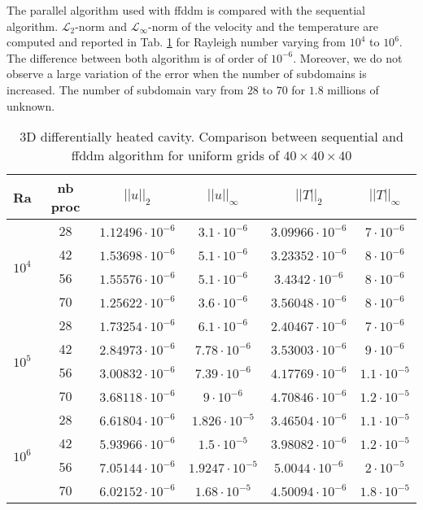 The parallel algorithm used with ffddm is compared with the sequential algorithm.
$\mathcal{L}_2$-norm and $\mathcal{L}_\infty$-norm of the velocity and the temperature are computed and reported in Tab. \ref{tab-T1} for Rayleigh number varying from $10^4$ to $10^6$.
The difference between both algorithm is of order of $10^{-6}$.
Moreover, we do not observe a large variation of the error when the number of subdomains is increased.
The number of subdomain vary from $28$ to $70$ for $1.8$ millions of unknown.

\begin{table}[!h]
	\begin{center}
		\begin{tabular}{|*{6}{c|}}
			\hline
			 Ra & nb proc                     & $||u||_{2}$                        & $||u||_{\infty}$                & $||T||_{2}$              & $||T||_{\infty}$\\ \hline \hline
			\multirow{4}{*}{$10^4$} & 28 & $1.12496 \cdot 10^{-6}$ & $3.1 \cdot 10^{-6}$ & $ 3.09966 \cdot 10^{-6} $ & $7 \cdot 10^{-6}$ \\%
			\cline{2-6}
			& 42 & $1.53698 \cdot 10^{-6}$ & $5.1 \cdot 10^{-6}$ & $ 3.23352 \cdot 10^{-6} $ & $8 \cdot 10^{-6}$ \\ \cline{2-6} %
			& 56 & $1.55576 \cdot 10^{-6}$ & $5.1 \cdot 10^{-6}$ & $ 3.4342 \cdot 10^{-6} $ & $8 \cdot 10^{-6}$  \\ \cline{2-6} %
			& 70 & $1.25622 \cdot 10^{-6}$ & $3.6 \cdot 10^{-6}$ & $ 3.56048 \cdot 10^{-6} $ & $8 \cdot 10^{-6}$ \\ \hline \hline
			\multirow{4}{*}{$10^5$} & 28 & $1.73254 \cdot 10^{-6}$ & $6.1 \cdot 10^{-6}$ & $ 2.40467 \cdot 10^{-6} $ & $7 \cdot 10^{-6}$ \\%
			\cline{2-6}
			& 42 & $2.84973 \cdot 10^{-6}$ & $7.78 \cdot 10^{-6}$ & $ 3.53003 \cdot 10^{-6} $ & $9 \cdot 10^{-6}$ \\ \cline{2-6} %
			& 56 & $3.00832 \cdot 10^{-6}$ & $7.39 \cdot 10^{-6}$ & $ 4.17769 \cdot 10^{-6} $ & $1.1 \cdot 10^{-5}$  \\ \cline{2-6} %
			& 70 & $3.68118 \cdot 10^{-6}$ & $9 \cdot 10^{-6}$ & $ 4.70846 \cdot 10^{-6} $ & $1.2 \cdot 10^{-5}$ \\ \hline \hline
			\multirow{4}{*}{$10^6$} & 28 & $6.61804 \cdot 10^{-6}$ & $1.826 \cdot 10^{-5}$ & $ 3.46504\cdot 10^{-6} $ & $1.1 \cdot 10^{-5}$ \\%
			\cline{2-6}
			& 42 & $5.93966 \cdot 10^{-6}$ & $1.5 \cdot 10^{-5}$ & $ 3.98082 \cdot 10^{-6} $ & $1.2 \cdot 10^{-5}$ \\ \cline{2-6} %
			& 56 & $7.05144 \cdot 10^{-6}$ & $1.9247 \cdot 10^{-5}$ & $ 5.0044 \cdot 10^{-6} $ & $2 \cdot 10^{-5}$  \\ \cline{2-6} %
			& 70 & $6.02152 \cdot 10^{-6}$ & $1.68 \cdot 10^{-5}$ & $ 4.50094 \cdot 10^{-6} $ & $1.8 \cdot 10^{-5}$ \\ \hline
		\end{tabular}
	\end{center}
	\caption {3D differentially heated cavity. Comparison between sequential and ffddm algorithm for uniform grids of $40 \times 40 \times 40$ }
	\label{tab-T1}
\end{table}


